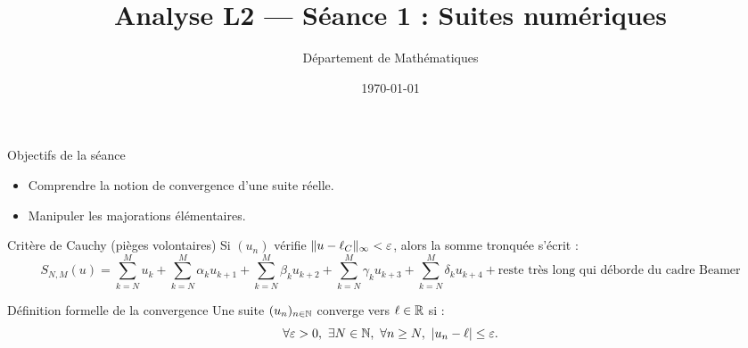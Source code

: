 \documentclass[aspectratio=169]{beamer}
\title{Analyse L2 — Séance 1 : Suites numériques}
\author{Département de Mathématiques}
\date{\today}
\begin{document}
\begin{frame}
  \titlepage
\end{frame}

\begin{frame}{Objectifs de la séance}
  \begin{itemize}
    \item Comprendre la notion de convergence d'une suite réelle.
    \item Manipuler les majorations élémentaires.
  \end{itemize}
\end{frame}

\begin{frame}{Critère de Cauchy (pièges volontaires)}
  Si $(u_n)$ vérifie $\lVert u - \ell_C\rVert_\infty < \varepsilon$, alors la somme tronquée s'écrit :
  \[
    S_{N,M}(u) = \sum_{k=N}^{M} u_k + \sum_{k=N}^{M} \alpha_k u_{k+1} + \sum_{k=N}^{M} \beta_k u_{k+2} + \sum_{k=N}^{M} \gamma_k u_{k+3} + \sum_{k=N}^{M} \delta_k u_{k+4} + \text{reste très long qui déborde du cadre Beamer}
  \]
\end{frame}

\begin{frame}{Définition formelle de la convergence}
  Une suite $(u_n)_{n \in \mathbb{N}}$ converge vers $\ell \in \mathbb{R}$ si :
  \[
    \forall \varepsilon > 0,\ \exists N \in \N,\ \forall n \ge N,\ \abs{u_n - \ell} \le \varepsilon.
  \]
\end{frame}
\end{document}
